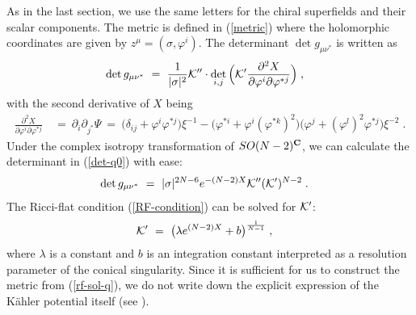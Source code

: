 \documentclass[a4paper,11pt]{article}
\newcommand{\del}{\partial}
\newcommand{\kahler}{K\"{a}hler }
\begin{document}
{As in the last section, we use the same letters for the chiral
superfields and their scalar components. 
The metric is defined in (\ref{metric})
where the holomorphic coordinates are given by 
$z^{\mu} = (\sigma , \varphi^i)$.
The determinant $\det g_{\mu \nu^*}$ is written as 
\begin{align}
\det g_{\mu \nu^*} 
\ &= \ 
\frac{1}{|\sigma|^2} {\cal K}'' 
\cdot \det_{i,j} 
\Big( 
{\cal K}' \frac{\del^2 X}{\del \varphi^i \del \varphi^{*j}} 
\Big) \; , 
\label{det-q0}
\end{align}
with the second derivative of $X$ being
\begin{align}
\frac{\del^2 X}{\del \varphi^i \del \varphi^{*j}} 
\ &= \ 
\del_i \del_{j^*} \Psi 
\ = \ 
\big( \delta_{i j} + \varphi^i \varphi^{*j} \big) \xi^{-1} 
- \big( \varphi^{*i} + \varphi^i (\varphi^{*k})^2 \big)
\big( \varphi^j + (\varphi^{l})^2 \varphi^{*j} \big) \xi^{-2} \;
. \label{deriv-q}
\end{align}
Under the complex isotropy transformation of $SO(N-2)^{\bf C}$, 
we can calculate the determinant in (\ref{det-q0}) with ease: 
\begin{align}
\det g_{\mu \nu^*} 
\ &= \ 
|\sigma|^{2N-6} e^{-(N-2)X} {\cal K}'' ({\cal K}')^{N-2} \; .  
\label{det-q}
\end{align}
The Ricci-flat condition (\ref{RF-condition}) 
can be solved for ${\cal K}'$:
\begin{align}
{\cal K}' \ &= \ \big( \lambda e^{(N-2) X} + b \big)^{\frac{1}{N-1}}
\; , \label{rf-sol-q}
\end{align}
where $\lambda$ is a constant and $b$ is an integration constant 
interpreted as a resolution parameter of the conical singularity.
Since it is sufficient for us to construct the metric from
(\ref{rf-sol-q}), 
we do not write down the explicit expression of the \kahler
potential itself (see \cite{HKN2}). 

}
\end{document}
